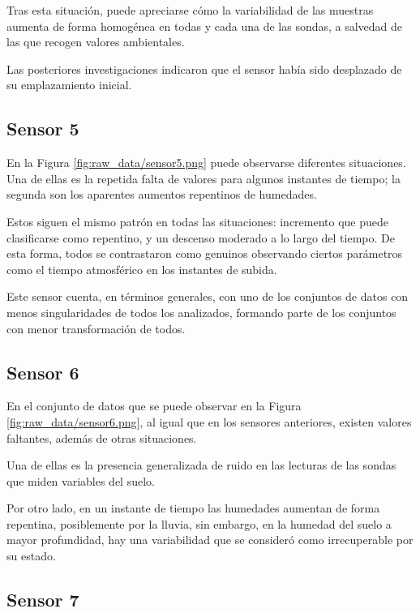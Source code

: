 Tras esta situación, puede apreciarse cómo la variabilidad de las muestras
aumenta de forma homogénea en todas y cada una de las sondas, a salvedad de las que recogen
valores ambientales.

Las posteriores investigaciones indicaron que el sensor había sido desplazado
de su emplazamiento inicial.

\newpage
\subsection{Sensor 5}


En la Figura \ref{fig:raw_data/sensor5.png} puede observarse diferentes situaciones.
Una de ellas es la repetida falta de valores para algunos instantes de tiempo; la 
segunda son los aparentes aumentos repentinos de humedades.

Estos siguen el mismo patrón en todas las situaciones: incremento que puede clasificarse
como repentino, y un descenso moderado a lo largo del tiempo.
De esta forma, todos se contrastaron como genuinos observando ciertos parámetros como
el tiempo atmosférico en los instantes de subida.

Este sensor cuenta, en términos generales, con uno de los conjuntos de datos con menos singularidades
de todos los analizados, formando parte de los conjuntos con menor transformación de todos.

\newpage
\subsection{Sensor 6}


En el conjunto de datos que se puede observar en la Figura \ref{fig:raw_data/sensor6.png},
al igual que en los sensores anteriores, existen valores faltantes, además de 
otras situaciones.

Una de ellas es la presencia generalizada de ruido en las lecturas
de las sondas que miden variables del suelo.

Por otro lado, en un instante de tiempo las humedades aumentan de forma repentina, posiblemente
por la lluvia, sin embargo, en la humedad del suelo a mayor profundidad, hay una variabilidad
que se consideró como irrecuperable por su estado.

\newpage
\subsection{Sensor 7}

